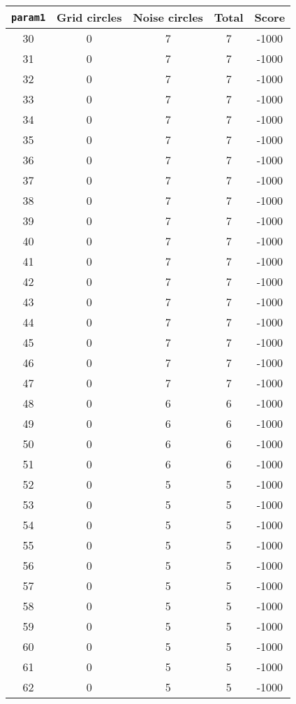 \documentclass[letterpaper, 12pt]{article}
\begin{document}
\begin{longtable}{|c|c|c|c|c|}
\hline
\textbf{\texttt{param1}} & \textbf{Grid circles} & \textbf{Noise circles} & \textbf{Total} & \textbf{Score} \\
\hline
30 & 0 & 7 & 7 & -1000 \\
\hline
31 & 0 & 7 & 7 & -1000 \\
\hline
32 & 0 & 7 & 7 & -1000 \\
\hline
33 & 0 & 7 & 7 & -1000 \\
\hline
34 & 0 & 7 & 7 & -1000 \\
\hline
35 & 0 & 7 & 7 & -1000 \\
\hline
36 & 0 & 7 & 7 & -1000 \\
\hline
37 & 0 & 7 & 7 & -1000 \\
\hline
38 & 0 & 7 & 7 & -1000 \\
\hline
39 & 0 & 7 & 7 & -1000 \\
\hline
40 & 0 & 7 & 7 & -1000 \\
\hline
41 & 0 & 7 & 7 & -1000 \\
\hline
42 & 0 & 7 & 7 & -1000 \\
\hline
43 & 0 & 7 & 7 & -1000 \\
\hline
44 & 0 & 7 & 7 & -1000 \\
\hline
45 & 0 & 7 & 7 & -1000 \\
\hline
46 & 0 & 7 & 7 & -1000 \\
\hline
47 & 0 & 7 & 7 & -1000 \\
\hline
48 & 0 & 6 & 6 & -1000 \\
\hline
49 & 0 & 6 & 6 & -1000 \\
\hline
50 & 0 & 6 & 6 & -1000 \\
\hline
51 & 0 & 6 & 6 & -1000 \\
\hline
52 & 0 & 5 & 5 & -1000 \\
\hline
53 & 0 & 5 & 5 & -1000 \\
\hline
54 & 0 & 5 & 5 & -1000 \\
\hline
55 & 0 & 5 & 5 & -1000 \\
\hline
56 & 0 & 5 & 5 & -1000 \\
\hline
57 & 0 & 5 & 5 & -1000 \\
\hline
58 & 0 & 5 & 5 & -1000 \\
\hline
59 & 0 & 5 & 5 & -1000 \\
\hline
60 & 0 & 5 & 5 & -1000 \\
\hline
61 & 0 & 5 & 5 & -1000 \\
\hline
62 & 0 & 5 & 5 & -1000 \\

\end{longtable}
\end{document}
